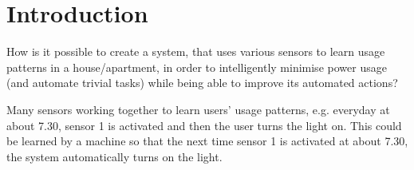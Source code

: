 \chapter{Introduction}\label{part:introduction}


\label{problemStatement}

How is it possible to create a system, that uses various sensors to learn usage patterns in a house/apartment, in order to intelligently minimise power usage (and automate trivial tasks) while being able to improve its automated actions?

Many sensors working together to learn users’ usage patterns, e.g. everyday at about 7.30, sensor 1 is activated and then the user turns the light on. This could be learned by a machine so that the next time sensor 1 is activated at about 7.30, the system automatically turns on the light.
